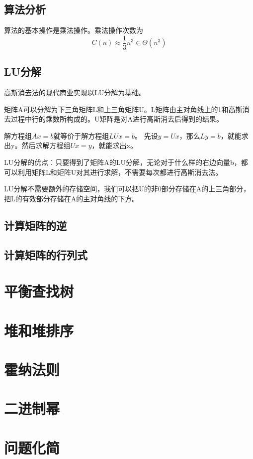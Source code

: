 \documentclass[a4paper,left=2.5cm,right=2.5cm,11pt]{article}
\begin{document}
\subsection{算法分析}
	算法的基本操作是乘法操作。乘法操作次数为
	\begin{equation}
		C(n) \approx \frac{1}{3}n^3 \in \Theta(n^3)
	\end{equation}

\subsection{LU分解}
	高斯消去法的现代商业实现以LU分解为基础。\par
	矩阵A可以分解为下三角矩阵L和上三角矩阵U。L矩阵由主对角线上的1和高斯消去过程中行的乘数所构成的。U矩阵是对A进行高斯消去后得到的结果。\par
	解方程组$Ax=b$就等价于解方程组$LUx=b$。
	先设$y=Ux$，那么$Ly=b$，就能求出y。然后求解方程组$Ux=y$，就能求出x。\par
	LU分解的优点：只要得到了矩阵A的LU分解，无论对于什么样的右边向量b，都可以利用矩阵L和矩阵U对其进行求解，不需要每次都进行高斯消去法。\par
	LU分解不需要额外的存储空间，我们可以把U的非0部分存储在A的上三角部分，把L的有效部分存储在A的主对角线的下方。

\subsection{计算矩阵的逆}
\subsection{计算矩阵的行列式}

\section{平衡查找树}
\section{堆和堆排序}
\section{霍纳法则}
\section{二进制幂}
\section{问题化简}
\end{document}
